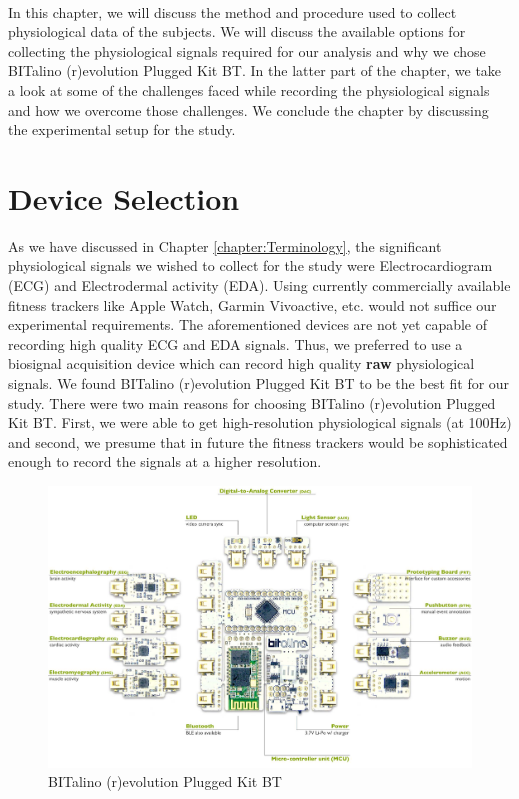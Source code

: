 \label{chapter:data_collection}
\paragraph{}
In this chapter, we will discuss the method and procedure used to collect physiological data of the subjects. We will discuss the available options for collecting the physiological signals required for our analysis and why we chose BITalino (r)evolution Plugged Kit BT. In the latter part of the chapter, we take a look at some of the challenges faced while recording the physiological signals and how we overcome those challenges. We conclude the chapter by discussing the experimental setup for the study.
\section{Device Selection}
As we have discussed in Chapter \ref{chapter:Terminology}, the significant physiological signals we wished to collect for the study were Electrocardiogram (ECG) and Electrodermal activity (EDA). Using currently commercially available fitness trackers like Apple Watch, Garmin Vivoactive, etc. would not suffice our experimental requirements. The aforementioned devices are not yet capable of recording high quality ECG and EDA signals. Thus, we preferred to use a biosignal acquisition device which can record high quality \textbf{raw} physiological signals. We found BITalino (r)evolution Plugged Kit BT to be the best fit for our study. There were two main reasons for choosing BITalino (r)evolution Plugged Kit BT. First, we were able to get high-resolution physiological signals (at 100Hz) and second, we presume that in future the fitness trackers would be sophisticated enough to record the signals at a higher resolution.
\begin{figure}
\centering
\includegraphics[width=150mm]{Figures/bitalino.jpg}
\caption{BITalino (r)evolution Plugged Kit BT \cite{bitalino_datasheet}}
\label{fig:bitalino}
\end{figure}
